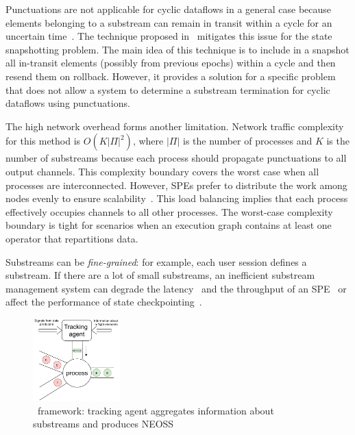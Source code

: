 Punctuations are not applicable for cyclic dataflows in a general case because elements belonging to a substream can remain in transit within a cycle for an uncertain time~\cite{carbone2018scalable}. The technique proposed in~\cite{Carbone:2017:SMA:3137765.3137777} mitigates this issue for the state snapshotting problem. The main idea of this technique is to include in a snapshot all in-transit elements (possibly from previous epochs) within a cycle and then resend them on rollback. However, it provides a solution for a specific problem that does not allow a system to determine a substream termination for cyclic dataflows using punctuations.

The high network overhead forms another limitation. Network traffic complexity for this method is $O(K|\Pi|^2)$, where $|\Pi|$ is the number of processes and $K$ is the number of substreams because each process should propagate punctuations to all output channels. This complexity boundary covers the worst case when all processes are interconnected. However, SPEs prefer to distribute the work among nodes evenly to ensure scalability~\cite{carbone2015apache, Kulkarni:2015:THS:2723372.2742788, Akidau:2013:MFS:2536222.2536229}. This load balancing implies that each process effectively occupies channels to all other processes. The worst-case complexity boundary is tight for scenarios when an execution graph contains at least one operator that repartitions data.

Substreams can be {\em fine-grained}: for example, each user session defines a substream. If there are a lot of small substreams, an inefficient substream management system can degrade the latency~\cite{DBLP:journals/pvldb/BegoliACHKKMS21} and the throughput of an SPE~\cite{Li:2008:OPN:1453856.1453890} or affect the performance of state checkpointing~\cite{zhang2021research}.

\begin{figure}[t]
  \centering
  \includegraphics[width=0.30\textwidth]{pics/tracker-scheme.pdf}
  \caption{\tracker\ framework: tracking agent aggregates information about substreams and produces NEOSS}
  \label{tracker_scheme}
\end{figure}

